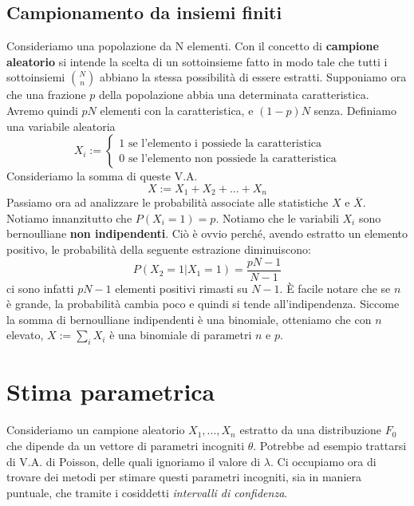 \documentclass[11pt]{article}
\begin{document}
\subsection{Campionamento da insiemi finiti}
Consideriamo una popolazione da N elementi. Con il concetto di \textbf{campione aleatorio} si intende la scelta di un sottoinsieme fatto in modo tale che tutti i sottoinsiemi ${N \choose n}$ abbiano la stessa possibilità di essere estratti. Supponiamo ora che una frazione $p$ della popolazione abbia una determinata caratteristica. Avremo quindi $pN$ elementi con la caratteristica, e $(1-p)N$ senza. Definiamo una variabile aleatoria
\begin{displaymath}
    X_i:=\begin{cases}
        1 \mbox{ se l'elemento i possiede la caratteristica}\\ 
        0 \mbox{ se l'elemento non possiede la caratteristica}
    \end{cases}
\end{displaymath}
Consideriamo la somma di queste V.A.
\begin{displaymath}
    X:=X_1+X_2+...+X_n
\end{displaymath}
Passiamo ora ad analizzare le probabilità associate alle statistiche $X$ e $\overline{X}$. Notiamo innanzitutto che $P(X_i = 1) = p$. Notiamo che le variabili $X_i$ sono bernoulliane \textbf{non indipendenti}. Ciò è ovvio perché, avendo estratto un elemento positivo, le probabilità della seguente estrazione diminuiscono:
\begin{displaymath}
    P(X_2 = 1 | X_1=1) = \frac{pN-1}{N-1}
\end{displaymath}
ci sono infatti $pN-1$ elementi positivi rimasti su $N-1$. È facile notare che se $n$ è grande, la probabilità cambia poco e quindi si tende all'indipendenza. Siccome la somma di bernoulliane indipendenti è una binomiale, otteniamo che con $n$ elevato, $X:=\sum_i X_i$ è una binomiale di parametri $n$ e $p$.
\section{Stima parametrica}
Consideriamo un campione aleatorio $X_1,...,X_n$ estratto da una distribuzione $F_0$ che dipende da un vettore di parametri incogniti $\theta$. Potrebbe ad esempio trattarsi di V.A. di Poisson, delle quali ignoriamo il valore di $\lambda$. Ci occupiamo ora di trovare dei metodi per stimare questi parametri incogniti, sia in maniera puntuale, che tramite i cosiddetti \textit{intervalli di confidenza}.  
\end{document}
